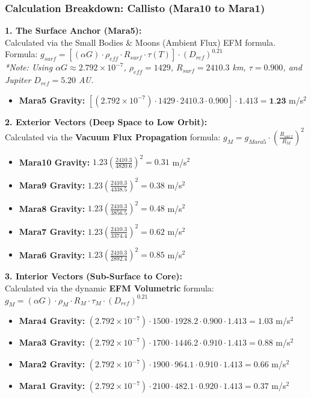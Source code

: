 \documentclass[11pt, a4paper]{article}
\begin{document}
\clearpage
\subsubsection{Calculation Breakdown: Callisto (Mara10 to Mara1)}

\noindent \textbf{1. The Surface Anchor (Mara5):} \\
Calculated via the Small Bodies \& Moons (Ambient Flux) EFM formula. \\
Formula: $g_{surf} = \left[ (\alpha G) \cdot \rho_{eff} \cdot R_{surf} \cdot \tau(T) \right] \cdot (D_{ref})^{0.21}$ \\
\textit{*Note: Using $\alpha G \approx 2.792 \times 10^{-7}$, $\rho_{eff} = 1429$, $R_{surf} = 2410.3$ km, $\tau = 0.900$, and Jupiter $D_{ref} = 5.20$ AU.}
\begin{itemize}
  \item \textbf{Mara5 Gravity:} $\left[ (2.792 \times 10^{-7}) \cdot 1429 \cdot 2410.3 \cdot 0.900 \right] \cdot 1.413 = \textbf{1.23}$ m/s$^2$
\end{itemize}

\vspace{0.5em}
\noindent \textbf{2. Exterior Vectors (Deep Space to Low Orbit):} \\
Calculated via the \textbf{Vacuum Flux Propagation} formula: $g_M = g_{Mara5} \cdot \left( \frac{R_{surf}}{R_M} \right)^2$
\begin{itemize}
  \item \textbf{Mara10 Gravity:} $1.23 \left( \frac{2410.3}{4820.6} \right)^2 = 0.31$ m/s$^2$
  \item \textbf{Mara9 Gravity:} $1.23 \left( \frac{2410.3}{4338.5} \right)^2 = 0.38$ m/s$^2$
  \item \textbf{Mara8 Gravity:} $1.23 \left( \frac{2410.3}{3856.5} \right)^2 = 0.48$ m/s$^2$
  \item \textbf{Mara7 Gravity:} $1.23 \left( \frac{2410.3}{3374.4} \right)^2 = 0.62$ m/s$^2$
  \item \textbf{Mara6 Gravity:} $1.23 \left( \frac{2410.3}{2892.4} \right)^2 = 0.85$ m/s$^2$
\end{itemize}

\vspace{0.5em}
\noindent \textbf{3. Interior Vectors (Sub-Surface to Core):} \\
Calculated via the dynamic \textbf{EFM Volumetric} formula: $g_M = (\alpha G) \cdot \rho_{M} \cdot R_M \cdot \tau_M \cdot (D_{ref})^{0.21}$
\begin{itemize}
  \item \textbf{Mara4 Gravity:} $(2.792 \times 10^{-7}) \cdot 1500 \cdot 1928.2 \cdot 0.900 \cdot 1.413 = 1.03$ m/s$^2$
  \item \textbf{Mara3 Gravity:} $(2.792 \times 10^{-7}) \cdot 1700 \cdot 1446.2 \cdot 0.910 \cdot 1.413 = 0.88$ m/s$^2$
  \item \textbf{Mara2 Gravity:} $(2.792 \times 10^{-7}) \cdot 1900 \cdot 964.1 \cdot 0.910 \cdot 1.413 = 0.66$ m/s$^2$
  \item \textbf{Mara1 Gravity:} $(2.792 \times 10^{-7}) \cdot 2100 \cdot 482.1 \cdot 0.920 \cdot 1.413 = 0.37$ m/s$^2$
\end{itemize}
\end{document}
